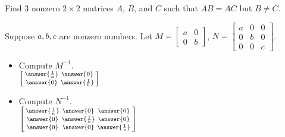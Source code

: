 \documentclass{ximera}
\begin{document}
\begin{exercise}
    Find 3 nonzero $2 \times 2$ matrices $A$, $B$, and $C$ such that $AB = AC$ but $B \not= C$.
\end{exercise}

\begin{exercise}%
    Suppose $a, b, c$ are nonzero numbers. Let
    $M=\left[ 
        \begin{smallmatrix}
            a & 0 \\
            0 & b
        \end{smallmatrix}
    \right]$,
    $N=\left[ 
        \begin{smallmatrix}
            a & 0 & 0 \\
            0 & b & 0 \\
            0 & 0 & c
        \end{smallmatrix}
    \right]$.
    \begin{itemize}
        \item Compute $M^{-1}$.\\
        $\left[ \begin{smallmatrix} \answer{\frac{1}{a}} & \answer{0} \\ \answer{0} & \answer{\frac{1}{b}} \end{smallmatrix}\right]$
        \item Compute $N^{-1}$.\\
        $\left[ \begin{smallmatrix} \answer{\frac{1}{a}} & \answer{0} & \answer{0} \\ \answer{0} & \answer{\frac{1}{b}} & \answer{0} \\ \answer{0} & \answer{0} & \answer{\frac{1}{c}} \end{smallmatrix}\right]$
    \end{itemize}
\end{exercise}
\end{document}

